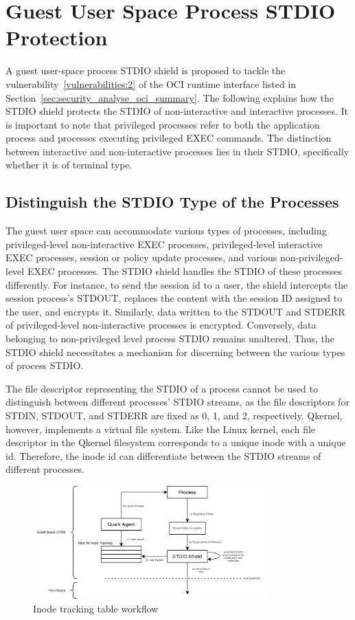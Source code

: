 \section{Guest User Space Process STDIO Protection}
\label{sec:design_STDIO_PROTECTION}
A guest user-space process STDIO shield is proposed to tackle the vulnerability~\ref{vulnerabilities:2} of the OCI runtime interface listed in Section~\ref{sec:security_analyse_oci_summary}. The following explains how the STDIO shield protects the STDIO of non-interactive and interactive processes. It is important to note that privileged processes refer to 
both the application process and processes executing privileged EXEC commands. The distinction between interactive and non-interactive processes lies in their STDIO, specifically whether it is of terminal type. 


\subsection{Distinguish the STDIO Type of the Processes}
\label{sec:design_Distinguish_io}

The guest user space can accommodate various types of processes, including privileged-level non-interactive EXEC processes, privileged-level interactive EXEC processes, session or policy update processes, and various non-privileged-level EXEC processes. The STDIO shield handles the STDIO of these processes differently. For instance, 
to send the session id to a user, the shield intercepts the session process's STDOUT, replaces the content with the session ID assigned to the user, and encrypts it. Similarly, data written to the STDOUT and STDERR of privileged-level non-interactive processes is encrypted. Conversely, data belonging 
to non-privileged level process STDIO remains unaltered. Thus, the STDIO shield necessitates a mechanism for discerning between the various types of process STDIO.
 
The file descriptor representing the STDIO of a process cannot be used to distinguish between different processes' STDIO streams, as the file descriptors for STDIN, STDOUT, and STDERR are fixed as 0, 1, and 2, respectively. Qkernel, however, implements a virtual file system. Like the Linux kernel, each file descriptor in the 
Qkernel filesystem corresponds to a unique inode with a unique id. Therefore, the inode id can differentiate between the STDIO streams of different processes.
\begin{figure}[!htb]
    \centering
    \includegraphics[width=0.8\textwidth]{images/differenciate_fds.png}
    \caption[Inode tracking table workflow]{Inode tracking table workflow}
    \label{fig:differenciate_fds}
\end{figure}
 
